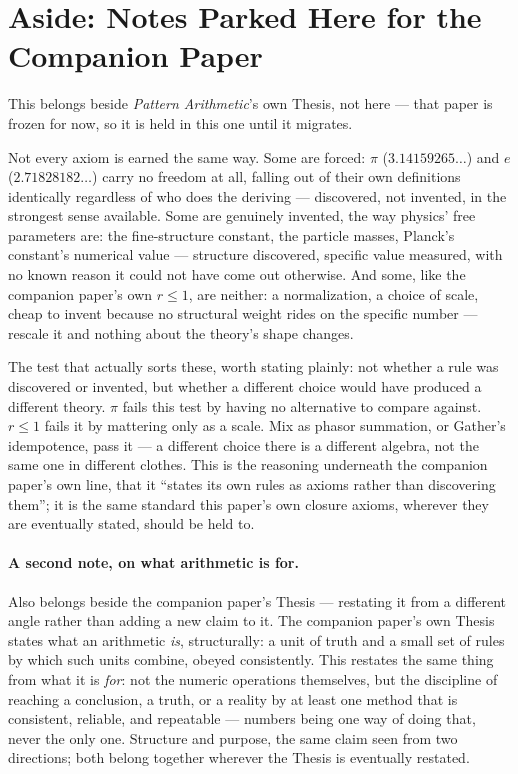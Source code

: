 \documentclass[12pt, a4paper]{article}
\begin{document}
\section*{Aside: Notes Parked Here for the Companion Paper}

This belongs beside \emph{Pattern Arithmetic}'s own Thesis, not
here --- that paper is frozen for now, so it is held in this one
until it migrates.

Not every axiom is earned the same way. Some are forced: $\pi$
($3.14159265\ldots$) and $e$ ($2.71828182\ldots$) carry no freedom at
all, falling out of their own definitions identically regardless of
who does the deriving --- discovered, not invented, in the strongest
sense available. Some are genuinely invented, the way physics' free
parameters are: the fine-structure constant, the particle masses,
Planck's constant's numerical value --- structure discovered,
specific value measured, with no known reason it could not have come
out otherwise. And some, like the companion paper's own $r\le1$, are
neither: a normalization, a choice of scale, cheap to invent because
no structural weight rides on the specific number --- rescale it and
nothing about the theory's shape changes.

The test that actually sorts these, worth stating plainly: not
whether a rule was discovered or invented, but whether a different
choice would have produced a different theory. $\pi$ fails this test
by having no alternative to compare against. $r\le1$ fails it by
mattering only as a scale. Mix as phasor summation, or Gather's
idempotence, pass it --- a different choice there is a different
algebra, not the same one in different clothes. This is the
reasoning underneath the companion paper's own
line, that it ``states its own rules as axioms rather than
discovering them''; it is the same standard this paper's own closure
axioms, wherever they are eventually stated, should be held to.

\paragraph{A second note, on what arithmetic is for.} Also belongs
beside the companion paper's Thesis --- restating it from a different
angle rather than adding a new claim to it. The companion paper's own
Thesis states what an arithmetic \emph{is}, structurally: a unit of
truth and a small set of rules by which such units combine, obeyed
consistently. This restates the same thing from what it is
\emph{for}: not the numeric operations themselves, but the discipline
of reaching a conclusion, a truth, or a reality by at least one
method that is consistent, reliable, and repeatable --- numbers being
one way of doing that, never the only one. Structure and purpose,
the same claim seen from two directions; both belong together
wherever the Thesis is eventually restated.
\end{document}
